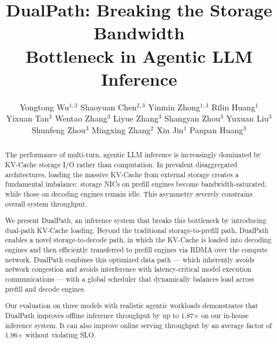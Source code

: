 \documentclass[sigconf,screen]{acmart}
\newcommand{\sysname}{DualPath\xspace}
\begin{document}
\title{\sysname: Breaking the Storage Bandwidth \\ Bottleneck in Agentic LLM Inference}

\author{Yongtong Wu$^{1,3}$ \enspace Shaoyuan Chen$^{2,3}$ \enspace Yinmin Zhong$^{1,3}$ \enspace Rilin Huang$^1$\\ 
Yixuan Tan$^3$ \enspace Wentao Zhang$^3$ \enspace Liyue Zhang$^3$ \enspace Shangyan Zhou$^3$ \enspace Yuxuan Liu$^3$ \enspace Shunfeng Zhou$^3$ \enspace Mingxing Zhang$^2$ \enspace Xin Jin$^1$ \enspace Panpan Huang$^3$}


\renewcommand{\shortauthors}{Wu et al.}
\def\shorttitle{\sysname}

\begin{abstract}

The performance of multi-turn, agentic LLM inference is increasingly dominated by KV-Cache storage I/O rather than computation. In prevalent disaggregated architectures, loading the massive KV-Cache from external storage creates a fundamental imbalance: storage NICs on prefill engines become bandwidth-saturated, while those on decoding engines remain idle. This asymmetry severely constrains overall system throughput.

We present \sysname, an inference system that breaks this bottleneck by introducing dual-path KV-Cache loading. Beyond the traditional storage-to-prefill path, \sysname enables a novel storage-to-decode path, in which the KV-Cache is loaded into decoding engines and then efficiently transferred to prefill engines via RDMA over the compute network. \sysname combines this optimized data path --- which inherently avoids network congestion and avoids interference with latency-critical model execution communications --- with a global scheduler that dynamically balances load across prefill and decode engines.

Our evaluation on three models with realistic agentic workloads demonstrates that \sysname improves offline inference throughput by up to 1.87$\times$ on our in-house inference system. It can also improve online serving throughput by an average factor of 1.96$\times$ without violating SLO.

\end{abstract}


\maketitle






\appendix

\end{document}
